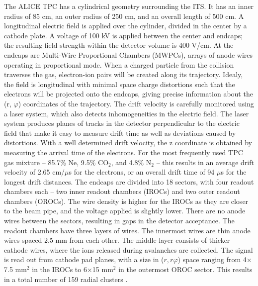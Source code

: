 The ALICE TPC has a cylindrical geometry surrounding the ITS. It has an inner radius of 85 cm, an outer radius of 250 cm, and an overall length of 500 cm. A longitudinal electric field is applied over the cylinder, divided in the center by a cathode plate.  A voltage of 100 kV is applied between the center and endcaps; the resulting field strength within the detector volume is 400 V/cm. At the endcaps are Multi-Wire Proportional Chambers (MWPCs), arrays of anode wires operating in proportional mode. When a charged particle from the collision traverses the gas, electron-ion pairs will be created along its trajectory. Idealy, the field is longitudinal with minimal space charge distortions such that the electrons will be projected onto the endcaps, giving precise information about the (r, $\varphi$) coordinates of the trajectory. The drift velocity is carefully monitored using a laser system, which also detects inhomogeneities in the electric field. The laser system produces planes of tracks in the detector perpendicular to the electric field that make it easy to measure drift time as well as deviations caused by distortions. With a well determined drift velocity, the z coordinate is obtained by measuring the arrival time of the electrons. For the most frequently used TPC gas mixture – 85.7\% Ne, 9.5\% CO$_2$, and 4.8\% N$_2$ – this results in an average drift velocity of 2.65 cm/$\mu$s for the electrons, or an overall drift time of 94 $\mu$s for the longest drift distances. The endcaps are divided into 18 sectors, with four readout chambers each – two inner readout chambers (IROCs) and two outer readout chambers (OROCs). The wire density is higher for the IROCs as they are closer to the beam pipe, and the voltage applied is slightly lower. There are no anode wires between the sectors, resulting in gaps in the detector acceptance. The readout chambers have three layers of wires. The innermost wires are thin anode wires spaced 2.5 mm from each other. The middle layer consists of thicker cathode wires, where the ions released during avalanches are collected. The signal is read out from cathode pad planes, with a size in ($r,r\varphi$) space ranging from 4$\times$7.5 mm$^2$ in the IROCs to 6$\times$15 mm$^2$ in the outermost OROC sector. This results in a total number of 159 radial clusters \cite{Alme2010}.


